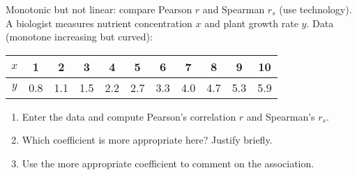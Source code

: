 \documentclass[11pt]{article}
\def\textbf#1{#1}%
\newcounter{question}
\begin{document}
\begin{question}
\textbf{Monotonic but not linear: compare Pearson $r$ and Spearman $r_s$ (use technology).}
A biologist measures nutrient concentration $x$ and plant growth rate $y$.
Data (monotone increasing but curved):
\begin{center}
\begin{tabular}{c|cccccccccc}
$x$ & 1 & 2 & 3 & 4 & 5 & 6 & 7 & 8 & 9 & 10\\\hline
$y$ & 0.8 & 1.1 & 1.5 & 2.2 & 2.7 & 3.3 & 4.0 & 4.7 & 5.3 & 5.9
\end{tabular}
\end{center}
\begin{enumerate}
  \item Enter the data and compute Pearson’s correlation $r$ and Spearman’s $r_s$.
  \item Which coefficient is more appropriate here? Justify briefly.
  \item Use the more appropriate coefficient to comment on the association.
\end{enumerate}
\begin{center}
\end{center}
\end{question}
\end{document}
